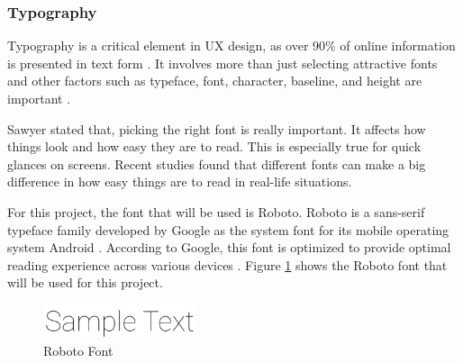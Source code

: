 \subsubsection{Typography}
Typography is a critical element in UX design, as over 90\% of online information is presented in text form \cite{Fitz-Patrick_2022}. It involves more than just selecting attractive fonts and other factors such as typeface, font, character, baseline, and height are important \cite{Fitz-Patrick_2022}.

Sawyer \cite{Sawyer2020} stated that, picking the right font is really important. It affects how things look and how easy they are to read. This is especially true for quick glances on screens. Recent studies found that different fonts can make a big difference in how easy things are to read in real-life situations.

For this project, the font that will be used is Roboto. Roboto is a sans-serif typeface family developed by Google as the system font for its mobile operating system Android \cite{Mott_2022}. According to Google, this font is optimized to provide optimal reading experience across various devices \cite{Mott_2022}. Figure \ref{fig:roboto} shows the Roboto font that will be used for this project.

\begin{figure}[!ht]
    \centering
    \includegraphics[width=0.4\textwidth]{texs/Part2/chapter3/image/roboto.png}
    \caption{Roboto Font}
    \label{fig:roboto}
\end{figure}











